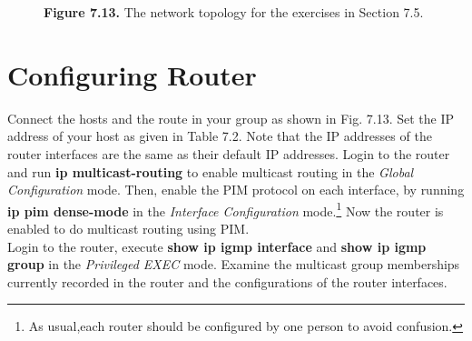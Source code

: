 \documentclass{../UTNetLab}
\begin{document}
    \begin{figure}[H]
        \centering
		\caption{\textbf{Figure 7.13.} The network topology for the exercises in Section 7.5.}
		\label{fig:7.13}
    \end{figure}

\section{Configuring Router}
\label{sec:config-router}
    Connect the hosts and the route in your group as shown in Fig. 7.13. Set the IP address of your host as given in Table 7.2. Note that the IP addresses of the router interfaces are the same as their default IP addresses.
    Login to the router and run \textbf{ip multicast-routing} to enable multicast routing in the \textit{Global Configuration} mode.
    Then, enable the PIM protocol on each interface, by running \textbf{ip pim dense-mode} in the \textit{Interface Configuration} mode.\footnote{As usual,each router should be configured by one person to avoid confusion.} Now the router is enabled to do multicast routing using PIM. \\
    Login to the router, execute \textbf{show ip igmp interface} and \textbf{show ip igmp group} in the \textit{Privileged EXEC} mode.
    Examine the multicast group memberships currently recorded in the router and the configurations of the router interfaces.
\end{document}

